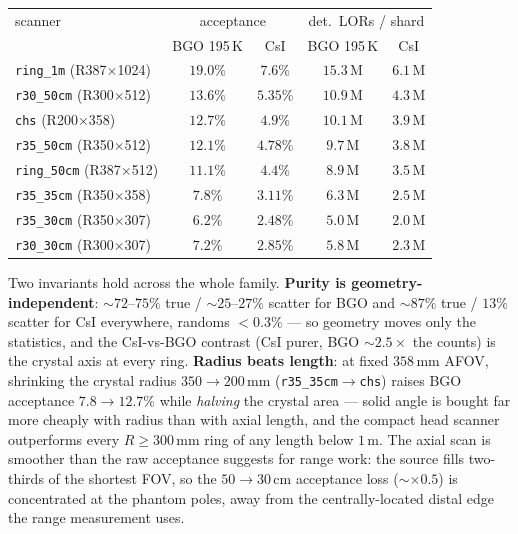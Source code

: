 \documentclass[11pt,a4paper]{article}
\begin{document}
\begin{center}
\begin{tabular}{lcccc}
\toprule
scanner & \multicolumn{2}{c}{acceptance} & \multicolumn{2}{c}{det.\ LORs / shard} \\
        & BGO 195\,K & CsI & BGO 195\,K & CsI \\
\midrule
\texttt{ring\_1m}   (R387$\times$1024) & $19.0\%$ & $7.6\%$  & $15.3$\,M & $6.1$\,M \\
\texttt{r30\_50cm}  (R300$\times$512)  & $13.6\%$ & $5.35\%$ & $10.9$\,M & $4.3$\,M \\
\texttt{chs}        (R200$\times$358)  & $12.7\%$ & $4.9\%$  & $10.1$\,M & $3.9$\,M \\
\texttt{r35\_50cm}  (R350$\times$512)  & $12.1\%$ & $4.78\%$ & $9.7$\,M  & $3.8$\,M \\
\texttt{ring\_50cm} (R387$\times$512)  & $11.1\%$ & $4.4\%$  & $8.9$\,M  & $3.5$\,M \\
\texttt{r35\_35cm}  (R350$\times$358)  & $7.8\%$  & $3.11\%$ & $6.3$\,M  & $2.5$\,M \\
\texttt{r35\_30cm}  (R350$\times$307)  & $6.2\%$  & $2.48\%$ & $5.0$\,M  & $2.0$\,M \\
\texttt{r30\_30cm}  (R300$\times$307)  & $7.2\%$  & $2.85\%$ & $5.8$\,M  & $2.3$\,M \\
\bottomrule
\end{tabular}
\end{center}

Two invariants hold across the whole family. \textbf{Purity is geometry-independent}:
${\sim}72$--$75\%$ true / ${\sim}25$--$27\%$ scatter for BGO and ${\sim}87\%$ true / $13\%$
scatter for CsI everywhere, randoms $<0.3\%$ --- so geometry moves only the statistics, and the
CsI-vs-BGO contrast (CsI purer, BGO ${\sim}2.5\times$ the counts) is the crystal axis at every
ring. \textbf{Radius beats length}: at fixed $358$\,mm AFOV, shrinking the crystal radius
$350\to200$\,mm (\texttt{r35\_35cm}$\to$\texttt{chs}) raises BGO acceptance $7.8\to12.7\%$ while
\emph{halving} the crystal area --- solid angle is bought far more cheaply with radius than with
axial length, and the compact head scanner outperforms every $R\ge300$\,mm ring of any length
below $1$\,m. The axial scan is smoother than the raw acceptance suggests for range work: the
source fills two-thirds of the shortest FOV, so the $50\to30$\,cm acceptance loss (${\sim}\times
0.5$) is concentrated at the phantom poles, away from the centrally-located distal edge the
range measurement uses.
\end{document}
